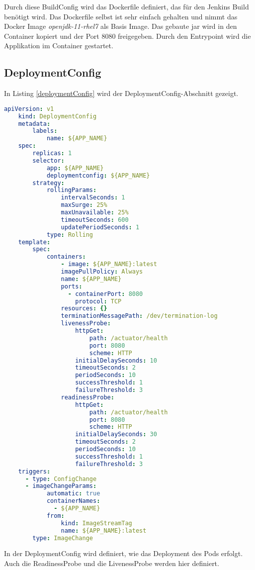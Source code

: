 Durch diese BuildConfig wird das Dockerfile definiert, das für den Jenkins Build benötigt wird. Das Dockerfile selbst ist sehr einfach gehalten und nimmt das Docker Image \textit{openjdk-11-rhel7} als Basis Image. Das gebaute jar wird in den Container kopiert und der Port 8080 freigegeben. Durch den Entrypoint wird die Applikation im Container gestartet.

\subsection{DeploymentConfig}
In Listing \ref{deploymentConfig} wird der DeploymentConfig-Abschnitt gezeigt.
\begin{lstlisting}[language=yml, caption=maven-pipeline.yml - DeploymentConfig, label=deploymentConfig]
	apiVersion: v1
	kind: DeploymentConfig
	metadata:
		labels:
			name: ${APP_NAME}
	spec:
		replicas: 1
		selector:
			app: ${APP_NAME}
			deploymentconfig: ${APP_NAME}
		strategy:
			rollingParams:
				intervalSeconds: 1
				maxSurge: 25%
				maxUnavailable: 25%
				timeoutSeconds: 600
				updatePeriodSeconds: 1
			type: Rolling
	template:
		spec:
			containers:
				- image: ${APP_NAME}:latest
				imagePullPolicy: Always
				name: ${APP_NAME}
				ports:
				  - containerPort: 8080
					protocol: TCP
				resources: {}
				terminationMessagePath: /dev/termination-log
				livenessProbe:
					httpGet:
						path: /actuator/health
						port: 8080
						scheme: HTTP
					initialDelaySeconds: 10
					timeoutSeconds: 2
					periodSeconds: 10
					successThreshold: 1
					failureThreshold: 3
				readinessProbe:
					httpGet:
						path: /actuator/health
						port: 8080
						scheme: HTTP
					initialDelaySeconds: 30
					timeoutSeconds: 2
					periodSeconds: 10
					successThreshold: 1
					failureThreshold: 3
	triggers:
	  - type: ConfigChange
	  - imageChangeParams:
			automatic: true
			containerNames:
		      - ${APP_NAME}
			from:
				kind: ImageStreamTag
				name: ${APP_NAME}:latest
		type: ImageChange
\end{lstlisting}

In der DeploymentConfig wird definiert, wie das Deployment des Pods erfolgt. Auch die ReadinessProbe und die LivenessProbe werden hier definiert.

